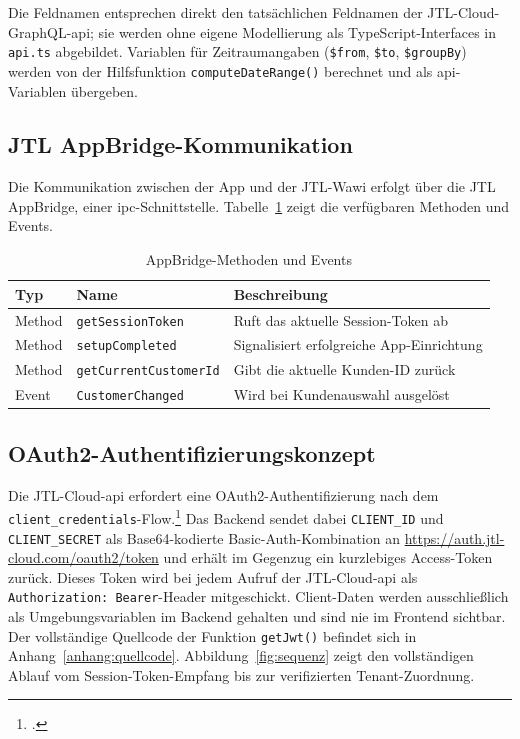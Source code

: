 \documentclass[11pt, a4paper, oneside]{report}
\begin{document}
Die Feldnamen entsprechen direkt den tatsächlichen Feldnamen der JTL-Cloud-GraphQL-\gls{api};
sie werden ohne eigene Modellierung als TypeScript-Interfaces in \texttt{api.ts}
abgebildet. Variablen für Zeitraumangaben (\texttt{\$from}, \texttt{\$to},
\texttt{\$groupBy}) werden von der Hilfsfunktion \texttt{computeDateRange()} berechnet
und als \gls{api}-Variablen übergeben.

\subsection{JTL AppBridge-Kommunikation}

Die Kommunikation zwischen der App und der JTL-Wawi erfolgt über die
JTL AppBridge, einer \gls{ipc}-Schnittstelle. Tabelle~\ref{tab:appbridge_methods}
zeigt die verfügbaren Methoden und Events.

\begin{table}[H]
  \centering
  \caption{AppBridge-Methoden und Events}
  \label{tab:appbridge_methods}
  \begin{tabularx}{\textwidth}{l l X}
    \toprule
    \textbf{Typ} & \textbf{Name} & \textbf{Beschreibung} \\
    \midrule
    Method & \texttt{getSessionToken} & Ruft das aktuelle Session-Token ab \\
    Method & \texttt{setupCompleted} & Signalisiert erfolgreiche App-Einrichtung \\
    Method & \texttt{getCurrentCustomerId} & Gibt die aktuelle Kunden-ID zurück \\
    Event  & \texttt{CustomerChanged} & Wird bei Kundenauswahl ausgelöst \\
    \bottomrule
  \end{tabularx}
\end{table}

\subsection{OAuth2-Authentifizierungskonzept}

Die JTL-Cloud-\gls{api} erfordert eine OAuth2-Authentifizierung nach dem
\texttt{client\_credentials}-Flow.\footcite{jtl_auth,oauth2_rfc}
Das Backend sendet dabei \texttt{CLIENT\_ID} und \texttt{CLIENT\_SECRET} als
Base64-kodierte Basic-Auth-Kombi\-nation an \url{https://auth.jtl-cloud.com/oauth2/token}
und erhält im Gegenzug ein kurzlebiges Access-Token zurück. Dieses Token wird bei
jedem Aufruf der JTL-Cloud-\gls{api} als \texttt{Authorization: Bearer}-Header
mitgeschickt. Client-Daten werden ausschließlich als Umgebungsvariablen im Backend
gehalten und sind nie im Frontend sichtbar. Der vollständige Quellcode der Funktion
\texttt{getJwt()} befindet sich in Anhang~\ref{anhang:quellcode}.
Abbildung~\ref{fig:sequenz} zeigt den vollständigen Ablauf vom Session-Token-Empfang
bis zur verifizierten Tenant-Zuordnung.
\end{document}
